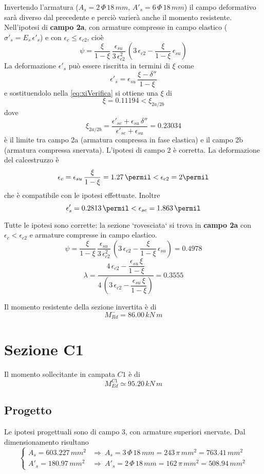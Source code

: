 Invertendo l'armatura ($A_s = 2\,\Phi\,18\,mm$, $A'_s = 6\,\Phi\,18\,mm$) il campo deformativo sarà diverso dal precedente e perciò varierà anche il momento resistente. Nell'ipotesi di \textbf{campo 2a}, con armature compresse in campo elastico ($\sigma'_s = E_s\,\epsilon'_s$) e con $\epsilon_c \leq \epsilon_{c2}$, cioè
\[
\psi = \dfrac{\xi}{1-\xi}\,\dfrac{\epsilon_{su}}{3\,\epsilon_{c2}^2}\,\left(3\,\epsilon_{c2} - \dfrac{\xi}{1-\xi}\,\epsilon_{su}\right)
\]
La deformazione $\epsilon'_s$ può essere riscritta in termini di $\xi$ come
\[
\epsilon'_s = \epsilon_{su}\,\dfrac{\xi - \delta''}{1-\xi}
\]
e sostituendolo nella \eqref{eq:xiVerifica} si ottiene una $\xi$ di
\[
\xi = 0.11194 < \xi_{2a/2b}
\]
dove
\[ 
\xi_{2a/2b} = \dfrac{\epsilon'_{se} + \epsilon_{su}\,\delta''}{\epsilon'_{se} + \epsilon_{su}} = 0.23034
\]
è il limite tra campo 2a (armatura compressa in fase elastica) e il campo 2b (armatura compressa snervata). L'ipotesi di campo 2 è corretta. La deformazione del calcestruzzo è
\[
\epsilon_c = \epsilon_{su}\,\dfrac{\xi}{1-\xi} = 1.27\,\permil < \epsilon_{c2} = 2\permil
\]
che è compatibile con le ipotesi effettuate. Inoltre
\[
\epsilon'_{s} = 0.2813\,\permil < \epsilon_{se} = 1.863\,\permil
\]

Tutte le ipotesi sono corrette: la sezione `rovesciata` si trova in \textbf{campo 2a} con $\epsilon_c < \epsilon_{c2}$ e armature compresse in campo elastico. 
\[
\psi = \dfrac{\xi}{1-\xi}\,\dfrac{\epsilon_{su}}{3\,\epsilon_{c2}^2}\,\left(3\,\epsilon_{c2} - \dfrac{\xi}{1-\xi}\,\epsilon_{su}\right) = 0.4978   
\]
\[
\lambda = \dfrac{4\,\epsilon_{c2} - \dfrac{\epsilon_{su}\,\xi}{1-\xi}}{4\,\left(3\,\epsilon_{c2} - \dfrac{\epsilon_{su}\,\xi}{1-\xi}\right)} = 0.3555
\]

Il momento resistente della sezione invertita è di 
\[
M_{Rd}^- = 86.00\,kN\,m
\]

\section{Sezione C1}
Il momento sollecitante in campata $C1$ è di 
\[
M_{Ed}^{C1} \simeq 95.20\,kN\,m
\]
\subsection{Progetto}
Le ipotesi progettuali sono di campo 3, con armature superiori snervate. Dal dimensionamento risultano
\[
\begin{cases}
    A_s = 603.227\,mm^2 &\Longrightarrow~A_s = 3\,\Phi\,18\,mm = 243\,\pi\,mm^2 = 763.41\,mm^2\\
	A'_s = 180.97\,mm^2 &\Longrightarrow~ A'_s = 2\,\Phi\,18\,mm = 162\,\pi\,mm^2 = 508.94\,mm^2
\end{cases}
\]

